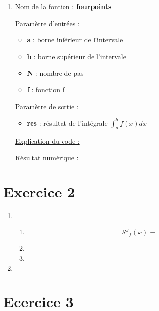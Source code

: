 \documentclass{article}
\begin{document}
\begin{enumerate}
\item
  \underline{Nom de la fontion :} \textbf{fourpoints} \newline
  
  \underline{Paramètre d'entrées :}
  \begin{itemize}
  \item \textbf{a} : borne inférieur de l'intervale
  \item \textbf{b} : borne supérieur de l'intervale
  \item \textbf{N} : nombre de pas
  \item \textbf{f} : fonction f
  \end{itemize}

  \underline{Paramètre de sortie :}
  \begin{itemize}
  \item \textbf{res} : résultat de l'intégrale $\int_a^b {f(x) dx}$
  \end{itemize}

  \underline{Explication du code :}

  \underline{Résultat numérique :}

\end{enumerate}

\section*{Exercice 2}

\begin{enumerate}

\item

  \begin{enumerate}

  \item

    \begin{equation*}
      S''_f(x) = 
    \end{equation*}

  \item

  \item

  \end{enumerate}

\item 
  
\end{enumerate}

\section*{Ecercice 3}
\end{document}
